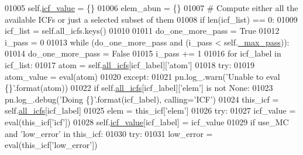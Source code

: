\begin{DoxyCode}
01005         self.\hyperlink{classpyneb_1_1core_1_1icf_1_1_i_c_f_a9dedc0eb2ad90ea08b8be9984e2d832b}{icf\_value} = \{\}
01006         elem\_abun = \{\}
01007         \textcolor{comment}{# Compute either all the available ICFs or just a selected subset of them}
01008         \textcolor{keywordflow}{if} len(icf\_list) == 0:
01009             icf\_list = self.all\_icfs.keys()
01010 
01011         do\_one\_more\_pass = \textcolor{keyword}{True}
01012         i\_pass = 0
01013         \textcolor{keywordflow}{while} (do\_one\_more\_pass \textcolor{keywordflow}{and} (i\_pass < self.\hyperlink{classpyneb_1_1core_1_1icf_1_1_i_c_f_a994574a4b1fff9d0700fb483dabc8238}{\_max\_pass})):
01014             do\_one\_more\_pass = \textcolor{keyword}{False}
01015             i\_pass += 1
01016             \textcolor{keywordflow}{for} icf\_label \textcolor{keywordflow}{in} icf\_list:
01017                 atom = self.\hyperlink{classpyneb_1_1core_1_1icf_1_1_i_c_f_a854ee87a53feb102e429e902227ce88b}{all\_icfs}[icf\_label][\textcolor{stringliteral}{'atom'}]
01018                 \textcolor{keywordflow}{try}:
01019                     atom\_value = eval(atom)
01020                 \textcolor{keywordflow}{except}:
01021                     pn.log\_.warn(\textcolor{stringliteral}{'Unable to eval \{\}'}.format(atom))
01022                 \textcolor{keywordflow}{if} self.\hyperlink{classpyneb_1_1core_1_1icf_1_1_i_c_f_a854ee87a53feb102e429e902227ce88b}{all\_icfs}[icf\_label][\textcolor{stringliteral}{'elem'}] \textcolor{keywordflow}{is} \textcolor{keywordflow}{not} \textcolor{keywordtype}{None}:
01023                     pn.log\_.debug(\textcolor{stringliteral}{'Doing \{\}'}.format(icf\_label), calling=\textcolor{stringliteral}{'ICF'})
01024                     this\_icf = self.\hyperlink{classpyneb_1_1core_1_1icf_1_1_i_c_f_a854ee87a53feb102e429e902227ce88b}{all\_icfs}[icf\_label]
01025                     elem = this\_icf[\textcolor{stringliteral}{'elem'}]
01026                     \textcolor{keywordflow}{try}:
01027                         icf\_value = eval(this\_icf[\textcolor{stringliteral}{'icf'}])
01028                         self.\hyperlink{classpyneb_1_1core_1_1icf_1_1_i_c_f_a9dedc0eb2ad90ea08b8be9984e2d832b}{icf\_value}[icf\_label] = icf\_value
01029                         \textcolor{keywordflow}{if} use\_MC \textcolor{keywordflow}{and} \textcolor{stringliteral}{'low\_error'} \textcolor{keywordflow}{in} this\_icf:
01030                             \textcolor{keywordflow}{try}:
01031                                 low\_error = eval(this\_icf[\textcolor{stringliteral}{'low\_error'}])

\end{DoxyCode}
